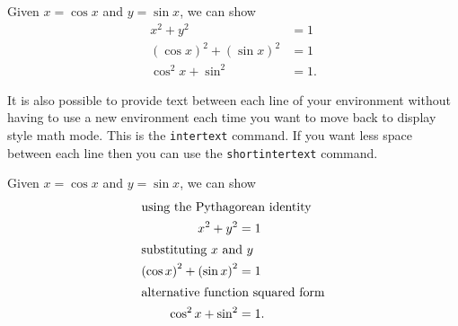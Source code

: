 \begin{mhotexbox}
  Given \( x = \cos x \) and \( y = \sin x \), we can show
  \begin{align*}
    x^2 + y^2 &= 1 \\
    \left( \cos x \right)^2 + \left( \sin x \right)^2 &= 1 \\
    \cos^2 x + \sin^2 &= 1.
  \end{align*}
\end{mhotexbox}

It is also possible to provide text between each line of your 
environment without having to use a new environment each time 
you want to move back to display style math mode.  This is 
the \verb!intertext! command.  If you want less space between
each line then you can use the \verb!shortintertext! command.

\begin{mhotexbox}
  Given \( x = \cos x \) and \( y = \sin x \), we can show
  \begin{align*}
    \shortintertext{using the Pythagorean identity}
    x^2 + y^2 &= 1 \\
    \intertext{substituting \(x \) and \(y \)}
    \left( \cos x \right)^2 + \left( \sin x \right)^2 &= 1 \\
    \shortintertext{alternative function squared form}
    \cos^2 x + \sin^2 &= 1.
  \end{align*}
\end{mhotexbox}
